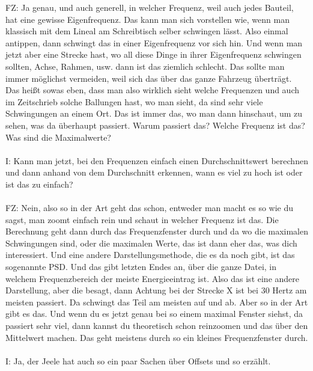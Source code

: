 \begin{linenumbers}
FZ: Ja genau, und auch generell, in welcher Frequenz, weil auch jedes Bauteil, hat eine gewisse Eigenfrequenz. Das kann man sich vorstellen wie, wenn man klassisch mit dem Lineal am Schreibtisch selber schwingen lässt. Also einmal antippen, dann schwingt das in einer Eigenfrequenz vor sich hin. Und wenn man jetzt aber eine Strecke hast, wo all diese Dinge in ihrer Eigenfrequenz schwingen sollten, Achse, Rahmen, usw. dann ist das ziemlich schlecht. Das sollte man immer möglichst vermeiden, weil sich das über das ganze Fahrzeug überträgt. Das heißt sowas eben, dass man also wirklich sieht welche Frequenzen und auch im Zeitschrieb solche Ballungen hast, wo man sieht, da sind sehr viele Schwingungen an einem Ort. Das ist immer das, wo man dann hinschaut, um zu sehen, was da überhaupt passiert. Warum passiert das? Welche Frequenz ist das? Was sind die Maximalwerte? \\\\
I: Kann man jetzt, bei den Frequenzen einfach einen Durchschnittswert berechnen und dann anhand von dem Durchschnitt erkennen, wann es viel zu hoch ist oder ist das zu einfach?\\\\
FZ: Nein, also so in der Art geht das schon, entweder man macht es so wie du sagst, man zoomt einfach rein und schaut in welcher Frequenz ist das. Die Berechnung geht dann durch das Frequenzfenster durch und da wo die maximalen Schwingungen sind, oder die maximalen Werte, das ist dann eher das, was dich interessiert. Und eine andere Darstellungsmethode, die es da noch gibt, ist das sogenannte \ac{PSD}. Und das gibt letzten Endes an, über die ganze Datei, in welchem Frequenzbereich der meiste Energieeintrag ist. Also das ist eine andere Darstellung, aber die besagt, dann Achtung bei der Strecke X ist bei 30 Hertz am meisten passiert. Da schwingt das Teil am meisten auf und ab. Aber so in der Art gibt es das. Und wenn du es jetzt genau bei so einem maximal Fenster siehst, da passiert sehr viel, dann kannst du theoretisch schon reinzoomen und das über den Mittelwert machen. Das geht meistens durch so ein kleines Frequenzfenster durch.\\\\
I: Ja, der Jeele hat auch so ein paar Sachen über Offsets und so erzählt.\\\\

\end{linenumbers}
